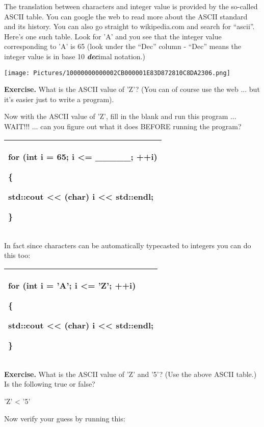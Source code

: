 \documentclass[
]{article}
\begin{document}
The translation between characters and integer value is provided by the
so-called ASCII table. You can google the web to read more about the
ASCII standard and its history. You can also go straight to
wikipedia.com and search for ``ascii''. Here's one such table. Look for
'A' and you see that the integer value corresponding to 'A' is 65 (look
under the ``Dec'' column - ``Dec'' means the integer value is in base 10
\emph{\textbf{dec}}imal notation.)

\texttt{[image: Pictures/10000000000002CB000001E83D872810C8DA2306.png]}

\textbf{Exercise.} What is the ASCII value of 'Z'? (You can of course
use the web ... but it's easier just to write a program).

Now with the ASCII value of 'Z', fill in the blank and run this program
... WAIT!!! ... can you figure out what it does BEFORE running the
program?

\begin{longtable}[]{@{}l@{}}
\toprule
\endhead
\begin{minipage}[t]{0.97\columnwidth}\raggedright
for (int i = 65; i \textless= \_\_\_\_\_; ++i)

\{

std::cout \textless\textless{} (char) i \textless\textless{} std::endl;

\}\strut
\end{minipage}\tabularnewline
\bottomrule
\end{longtable}

In fact since characters can be automatically typecasted to integers you
can do this too:

\begin{longtable}[]{@{}l@{}}
\toprule
\endhead
\begin{minipage}[t]{0.97\columnwidth}\raggedright
for (int i = 'A'; i \textless= 'Z'; ++i)

\{

std::cout \textless\textless{} (char) i \textless\textless{} std::endl;

\}\strut
\end{minipage}\tabularnewline
\bottomrule
\end{longtable}

\textbf{Exercise.} What is the ASCII value of 'Z' and '5'? (Use the
above ASCII table.) Is the following true or false?

'Z' \textless{} '5'

Now verify your guess by running this:
\end{document}
